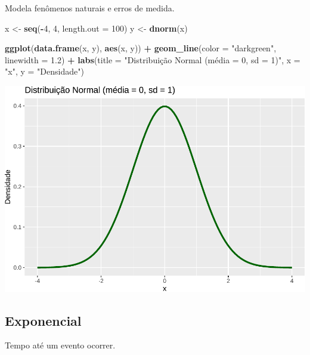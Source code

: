 \documentclass[
]{book}
\newenvironment{Shaded}{\begin{snugshade}}{\end{snugshade}}
\newcommand{\AttributeTok}[1]{\textcolor[rgb]{0.13,0.29,0.53}{#1}}
\newcommand{\DecValTok}[1]{\textcolor[rgb]{0.00,0.00,0.81}{#1}}
\newcommand{\FloatTok}[1]{\textcolor[rgb]{0.00,0.00,0.81}{#1}}
\newcommand{\FunctionTok}[1]{\textcolor[rgb]{0.13,0.29,0.53}{\textbf{#1}}}
\newcommand{\NormalTok}[1]{#1}
\newcommand{\OtherTok}[1]{\textcolor[rgb]{0.56,0.35,0.01}{#1}}
\newcommand{\SpecialCharTok}[1]{\textcolor[rgb]{0.81,0.36,0.00}{\textbf{#1}}}
\newcommand{\StringTok}[1]{\textcolor[rgb]{0.31,0.60,0.02}{#1}}
\begin{document}
Modela fenômenos naturais e erros de medida.

\begin{Shaded}
\begin{Highlighting}[]
\NormalTok{x }\OtherTok{\textless{}{-}} \FunctionTok{seq}\NormalTok{(}\SpecialCharTok{{-}}\DecValTok{4}\NormalTok{, }\DecValTok{4}\NormalTok{, }\AttributeTok{length.out =} \DecValTok{100}\NormalTok{)}
\NormalTok{y }\OtherTok{\textless{}{-}} \FunctionTok{dnorm}\NormalTok{(x)}

\FunctionTok{ggplot}\NormalTok{(}\FunctionTok{data.frame}\NormalTok{(x, y), }\FunctionTok{aes}\NormalTok{(x, y)) }\SpecialCharTok{+}
  \FunctionTok{geom\_line}\NormalTok{(}\AttributeTok{color =} \StringTok{"darkgreen"}\NormalTok{, }\AttributeTok{linewidth =} \FloatTok{1.2}\NormalTok{) }\SpecialCharTok{+}
  \FunctionTok{labs}\NormalTok{(}\AttributeTok{title =} \StringTok{"Distribuição Normal (média = 0, sd = 1)"}\NormalTok{, }\AttributeTok{x =} \StringTok{"x"}\NormalTok{, }\AttributeTok{y =} \StringTok{"Densidade"}\NormalTok{)}
\end{Highlighting}
\end{Shaded}

\includegraphics{Livro-Estatistica+R_files/figure-latex/normal_plot-1.pdf}

\subsection{Exponencial}\label{exponencial}

Tempo até um evento ocorrer.
\end{document}
